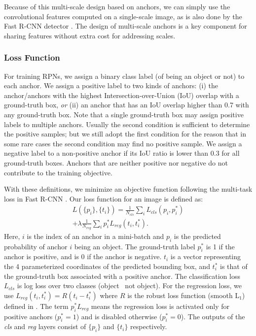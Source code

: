 \documentclass[10pt,journal,cspaper,compsoc]{IEEEtran}
\def\cls{\mathit{cls}}
\def\reg{\mathit{reg}}
\begin{document}
Because of this multi-scale design based on anchors, we can simply use the convolutional features computed on a single-scale image, as is also done by the Fast R-CNN detector \cite{Girshick2015a}. The design of multi-scale anchors is a key component for sharing features without extra cost for addressing scales.

\subsubsection{Loss Function}

For training RPNs, we assign a binary class label (of being an object or not) to each anchor.
We assign a positive label to two kinds of anchors: (i) the anchor/anchors with the highest Intersection-over-Union (IoU) overlap with a ground-truth box, \emph{or} (ii) an anchor that has an IoU overlap higher than 0.7 with any ground-truth box.
Note that a single ground-truth box may assign positive labels to multiple anchors. Usually the second condition is sufficient to determine the positive samples; but we still adopt the first condition for the reason that in some rare cases the second condition may find no positive sample.
We assign a negative label to a non-positive anchor if its IoU ratio is lower than 0.3 for all ground-truth boxes.
Anchors that are neither positive nor negative do not contribute to the training objective.

With these definitions, we minimize an objective function following the multi-task loss in Fast R-CNN \cite{Girshick2015a}. Our loss function for an image is defined as:
\begin{equation}\label{eq:loss}
\begin{aligned}
L(\{p_i\}, \{t_i\}) = \frac{1}{N_{\cls}}\sum_i L_{\cls}(p_i, p^{*}_i) \\ + \lambda\frac{1}{N_{\reg}}\sum_i  p^{*}_i L_{\reg}(t_i, t^{*}_i).
\end{aligned}
\end{equation}
Here, $i$ is the index of an anchor in a mini-batch and $p_i$ is the predicted probability of anchor $i$ being an object. The ground-truth label $p^{*}_i$ is 1 if the anchor is positive, and is 0 if the anchor is negative. $t_i$ is a vector representing the 4 parameterized coordinates of the predicted bounding box, and $t^{*}_i$ is that of the ground-truth box associated with a positive anchor.
The classification loss $L_{\cls}$ is log loss over two classes (object \vs~not object).
For the regression loss, we use $L_{\reg}(t_i, t^{*}_i)=R(t_i - t^{*}_i)$ where $R$ is the robust loss function (smooth L$_1$) defined in \cite{Girshick2015a}. The term $p^{*}_i L_{\reg}$ means the regression loss is activated only for positive anchors ($p^{*}_i=1$) and is disabled otherwise ($p^{*}_i=0$). The outputs of the \emph{cls} and \emph{reg} layers consist of $\{p_i\}$ and $\{t_i\}$ respectively.
\end{document}
